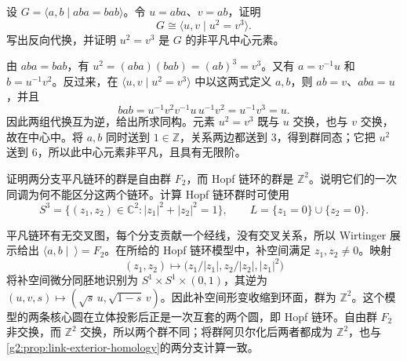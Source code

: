 \BookExercises

\begin{exercise}\label{g2:ex:trefoil-torus-presentation}
	设 \(G=\langle a,b\mid aba=bab\rangle\)。令 \(u=aba\)、\(v=ab\)，证明
	\[
		G\cong\langle u,v\mid u^2=v^3\rangle.
	\]
	写出反向代换，并证明 \(u^2=v^3\) 是 \(G\) 的非平凡中心元素。
\end{exercise}
\begin{solution}
	由 \(aba=bab\)，有 \(u^2=(aba)(bab)=(ab)^3=v^3\)。又有 \(a=v^{-1}u\) 和 \(b=u^{-1}v^2\)。反过来，在 \(\langle u,v\mid u^2=v^3\rangle\) 中以这两式定义 \(a,b\)，则 \(ab=v\)、\(aba=u\)，并且
	\[
		bab=u^{-1}v^2v^{-1}u\,u^{-1}v^2
		=u^{-1}v^3=u.
	\]
	因此两组代换互为逆，给出所求同构。元素 \(u^2=v^3\) 既与 \(u\) 交换，也与 \(v\) 交换，故在中心中。将 \(a,b\) 同时送到 \(1\in\mathbb Z\)，关系两边都送到 \(3\)，得到群同态；它把 \(u^2\) 送到 \(6\)，所以此中心元素非平凡，且具有无限阶。
\end{solution}

\begin{exercise}\label{g2:ex:unlink-hopf-complements}
	证明两分支平凡链环的群是自由群 \(F_2\)，而 Hopf 链环的群是 \(\mathbb Z^2\)。说明它们的一次同调为何不能区分这两个链环。计算 Hopf 链环群时可使用
	\[
		S^3=\{(z_1,z_2)\in\mathbb C^2:|z_1|^2+|z_2|^2=1\},
		\qquad L=\{z_1=0\}\cup\{z_2=0\}.
	\]
\end{exercise}
\begin{solution}
	平凡链环有无交叉图，每个分支贡献一个经线，没有交叉关系，所以 Wirtinger 展示给出 \(\langle a,b\mid\ \rangle=F_2\)。在所给的 Hopf 链环模型中，补空间满足 \(z_1,z_2\neq0\)。映射
	\[
		(z_1,z_2)\longmapsto\bigl(z_1/|z_1|,z_2/|z_2|,|z_1|^2\bigr)
	\]
	将补空间微分同胚地识别为 \(S^1\times S^1\times(0,1)\)，其逆为 \((u,v,s)\mapsto(\sqrt{s}\,u,\sqrt{1-s}\,v)\)。因此补空间形变收缩到环面，群为 \(\mathbb Z^2\)。这个模型的两条核心圆在立体投影后正是一次互套的两个圆，即 Hopf 链环。自由群 \(F_2\) 非交换，而 \(\mathbb Z^2\) 交换，所以两个群不同；将群阿贝尔化后两者都成为 \(\mathbb Z^2\)，也与\cref{g2:prop:link-exterior-homology}的两分支计算一致。
\end{solution}

